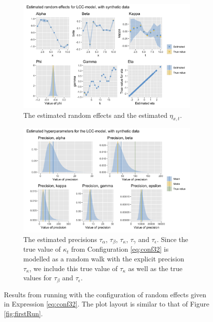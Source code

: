 \begin{figure}[h!]
    \centering
    \begin{subfigure}[b]{0.85\textwidth}
        \centering
        \includegraphics[width=\textwidth]{synthetic-data/Figures/effects-LCC-synthetic-3-2.png}
        \caption{The estimated random effects and the estimated $\eta_{x,t}$.}
        \label{fig:conf32-top}
    \end{subfigure}
    
    \begin{subfigure}[b]{0.6\textwidth}
        \centering
        \includegraphics[width=\textwidth]{synthetic-data/Figures/hyperparameters-LCC-synthetic-3-2.png}
        \caption{The estimated precisions $\tau_\alpha$, $\tau_\beta$, $\tau_\kappa$, $\tau_\gamma$ and $\tau_\epsilon$. Since the true value of $\kappa_t$ from Configuration \ref{eq:conf32} is modelled as a random walk with the explicit precision $\tau_\kappa$, we include this true value of $\tau_\kappa$ as well as the true values for $\tau_\beta$ and $\tau_\epsilon$. }
        \label{fig:conf32-bottom}
    \end{subfigure}
    \caption{Results from running \inlabru with the configuration of random effects given in Expression \ref{eq:conf32}. The plot layout is similar to that of Figure \ref{fig:firstRun}.}
    \label{fig:conf32}
\end{figure}

